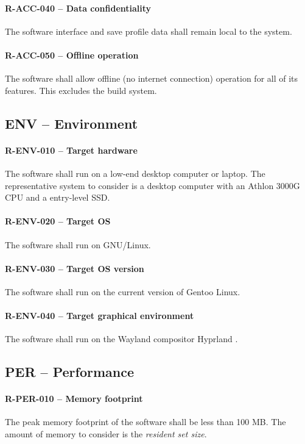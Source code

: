 \paragraph{R-ACC-040 -- Data confidentiality}
The software interface and save profile data shall remain local to the system.

\paragraph{R-ACC-050 -- Offline operation}
The software shall allow offline (no internet connection) operation for all of
its features. This excludes the build system.

\subsection{ENV -- Environment}
\paragraph{R-ENV-010 -- Target hardware}
The software shall run on a low-end desktop computer or laptop.
The representative system to consider is a desktop computer with
an Athlon 3000G CPU and a entry-level SSD.

\paragraph{R-ENV-020 -- Target OS}
The software shall run on GNU/Linux.

\paragraph{R-ENV-030 -- Target OS version}
The software shall run on the current version of Gentoo Linux.

\paragraph{R-ENV-040 -- Target graphical environment}
The software shall run on the Wayland compositor Hyprland \cite{hyprland}.

\subsection{PER -- Performance}
\paragraph{R-PER-010 -- Memory footprint}
The peak memory footprint of the software shall be less than 100 MB.
The amount of memory to consider is the \emph{resident set size}.

